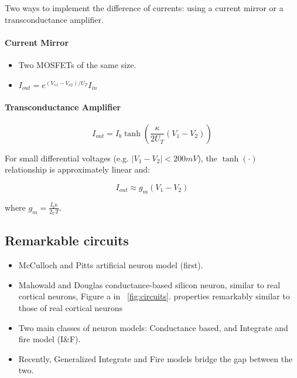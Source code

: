 \documentclass[main]{subfiles}
\begin{document}
Two ways to implement the difference of currents: using a current mirror or a transconductance amplifier.

\paragraph{Current Mirror}
\begin{itemize}[noitemsep,nolistsep]
	\item Two MOSFETs of the same size.
	\item $I_{out}=e^{(V_{s1}-V_{s2})/U_T}I_{in}$
\end{itemize}

\paragraph{Transconductance Amplifier}
\[I_{out}=I_b\tanh(\frac{\kappa}{2U_T}(V_1-V_2))\]

For small differential voltages (e.g. $|V_1 - V_2| < 200 mV $), the $\tanh(\cdot)$ relationship is approximately linear and:

\[I_{out} \approx g_m(V_1-V_2)\]

where $g_m = \frac{I_b \kappa}{2_UT}$.

\subsection{Remarkable circuits}
\begin{itemize}
	\item McCulloch and Pitts artificial neuron model (first).
	\item Mahowald and Douglas conductance-based silicon neuron, similar to real cortical neurons, Figure a in ~\ref{fig:circuits}.
	\subitem properties remarkably similar to those of real cortical neurons
	\item Two main classes of neuron models: Conductance based, and Integrate and fire model (I\&F).
	\item Recently, Generalized Integrate and Fire models bridge the gap between the two.
\end{itemize}
\end{document}
